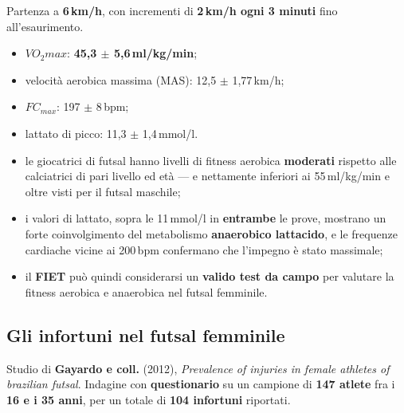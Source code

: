 Partenza a \textbf{6\,km/h}, con incrementi di \textbf{2\,km/h ogni 3 minuti} fino
all'esaurimento.
\begin{itemize}
  \item $VO_2max$: \textbf{45,3 $\pm$ 5,6\,ml/kg/min};
  \item velocità aerobica massima (MAS): 12,5 $\pm$ 1,77\,km/h;
  \item $FC_{max}$: 197 $\pm$ 8\,bpm;
  \item lattato di picco: 11,3 $\pm$ 1,4\,mmol/l.
\end{itemize}

\begin{itemize}
  \item le giocatrici di futsal hanno livelli di fitness aerobica \textbf{moderati} rispetto alle
    calciatrici di pari livello ed età --- e nettamente inferiori ai 55\,ml/kg/min e oltre visti
    per il futsal maschile;
  \item i valori di lattato, sopra le 11\,mmol/l in \textbf{entrambe} le prove, mostrano un forte
    coinvolgimento del metabolismo \textbf{anaerobico lattacido}, e le frequenze cardiache vicine
    ai 200\,bpm confermano che l'impegno è stato massimale;
  \item il \textbf{FIET} può quindi considerarsi un \textbf{valido test da campo} per valutare la
    fitness aerobica e anaerobica nel futsal femminile.
\end{itemize}

\subsection{Gli infortuni nel futsal femminile}

Studio di \textbf{Gayardo e coll.} (2012), \textit{Prevalence of injuries in female athletes of
brazilian futsal}. Indagine con \textbf{questionario} su un campione di \textbf{147 atlete} fra i
\textbf{16 e i 35 anni}, per un totale di \textbf{104 infortuni} riportati.

